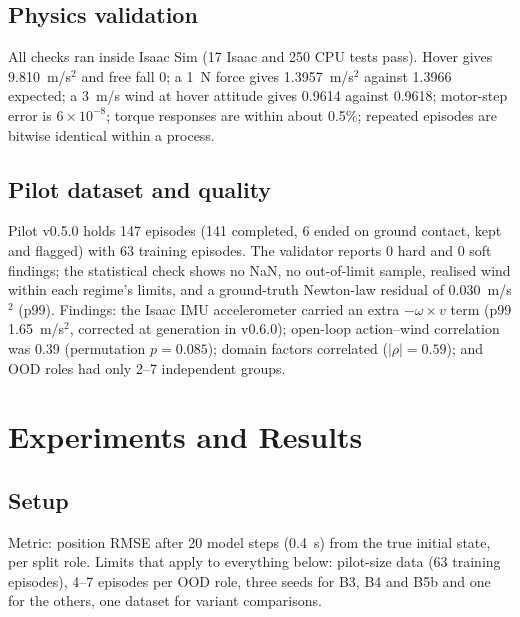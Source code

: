 \documentclass[conference]{IEEEtran}
\begin{document}
\subsection{Physics validation}
All checks ran inside Isaac Sim (17 Isaac and 250 CPU tests pass). Hover gives 9.810~m/s$^2$ and free fall 0; a 1~N force gives 1.3957~m/s$^2$ against 1.3966 expected; a 3~m/s wind at hover attitude gives 0.9614 against 0.9618; motor-step error is $6\times10^{-8}$; torque responses are within about 0.5\%; repeated episodes are bitwise identical within a process.

\subsection{Pilot dataset and quality}
Pilot v0.5.0 holds 147 episodes (141 completed, 6 ended on ground contact, kept and flagged) with 63 training episodes. The validator reports 0 hard and 0 soft findings; the statistical check shows no NaN, no out-of-limit sample, realised wind within each regime's limits, and a ground-truth Newton-law residual of 0.030~m/s$^2$ (p99). Findings: the Isaac IMU accelerometer carried an extra $-\omega\times v$ term (p99 1.65~m/s$^2$, corrected at generation in v0.6.0); open-loop action--wind correlation was 0.39 (permutation $p=0.085$); domain factors correlated ($|\rho|=0.59$); and OOD roles had only 2--7 independent groups.

\section{Experiments and Results}
\subsection{Setup}
Metric: position RMSE after 20 model steps (0.4~s) from the true initial state, per split role. Limits that apply to everything below: pilot-size data (63 training episodes), 4--7 episodes per OOD role, three seeds for B3, B4 and B5b and one for the others, one dataset for variant comparisons.
\end{document}
